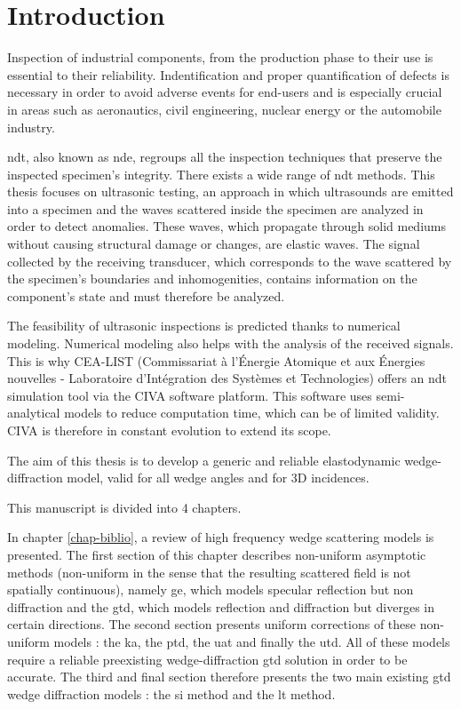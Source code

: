 \chapter*{Introduction}

Inspection of industrial components, from the production phase to their use is essential to their reliability. Indentification and proper quantification of defects is necessary in order to avoid adverse events for end-users and is especially crucial in areas such as aeronautics, civil engineering, nuclear energy or the automobile industry. 

\acrfull{ndt}, also known as \acrfull{nde}, regroups all the inspection techniques that preserve the inspected specimen's integrity. There exists a wide range of \acrshort{ndt} methods. This thesis focuses on ultrasonic testing, an approach in which ultrasounds are emitted into a specimen and the waves scattered inside the specimen are analyzed in order to detect anomalies. These waves, which propagate through solid mediums without causing structural damage or changes, are elastic waves. The signal collected by the receiving transducer, which corresponds to the wave scattered by the specimen's boundaries and inhomogenities, contains information on the component's state and must therefore be analyzed.

The feasibility of ultrasonic inspections is predicted thanks to numerical modeling. Numerical modeling also helps with the analysis of the received signals. This is why CEA-LIST (Commissariat à l’Énergie Atomique et aux Énergies nouvelles - Laboratoire d’Intégration des Systèmes et Technologies) offers an \acrshort{ndt} simulation tool via the CIVA software platform. This software uses semi-analytical models to reduce computation time, which can be of limited validity. CIVA is therefore in constant evolution to extend its scope.

The aim of this thesis is to develop a generic and reliable elastodynamic wedge-diffraction model, valid for all wedge angles and for 3D incidences.

This manuscript is divided into 4 chapters.

In chapter \ref{chap-biblio}, a review of high frequency wedge scattering models is presented. The first section of this chapter describes non-uniform asymptotic methods (non-uniform in the sense that the resulting scattered field is not spatially continuous), namely \acrfull{ge}, which models specular reflection but non diffraction and the \acrfull{gtd}, which models reflection and diffraction but diverges in certain directions. The second section presents uniform corrections of these non-uniform models : the \acrfull{ka}, the \acrfull{ptd}, the \acrfull{uat} and finally the \acrfull{utd}. All of these models require a reliable preexisting wedge-diffraction \acrshort{gtd} solution in order to be accurate. The third and final section therefore presents the two main existing \acrshort{gtd} wedge diffraction models : the \acrfull{si} method and the \acrfull{lt} method.

